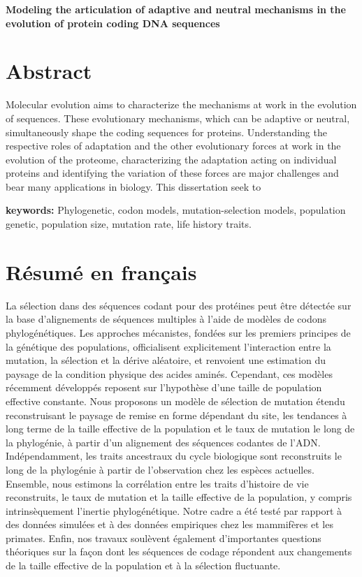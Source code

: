 \begin{center}
	\LARGE
	\textbf{Modeling the articulation of adaptive and neutral mechanisms in the evolution of protein coding DNA sequences}
\end{center}
\endgroup
\begingroup
\setlength{\parskip}{0.5em}

\section*{Abstract}
Molecular evolution aims to characterize the mechanisms at work in the evolution of sequences.
These evolutionary mechanisms, which can be adaptive or neutral, simultaneously shape the coding sequences for proteins.
Understanding the respective roles of adaptation and the other evolutionary forces at work in the evolution of the proteome, characterizing the adaptation acting on individual proteins and identifying the variation of these forces are major challenges and bear many applications in biology.
This dissertation seek to 

\textbf{keywords: }{Phylogenetic, codon models, mutation-selection models, population genetic, population size, mutation rate, life history traits.}

\newpage
\section*{Résumé en français}

La sélection dans des séquences codant pour des protéines peut être détectée sur la base d'alignements de séquences multiples à l'aide de modèles de codons phylogénétiques.
Les approches mécanistes, fondées sur les premiers principes de la génétique des populations, officialisent explicitement l'interaction entre la mutation, la sélection et la dérive aléatoire, et renvoient une estimation du paysage de la condition physique des acides aminés.
Cependant, ces modèles récemment développés reposent sur l'hypothèse d'une taille de population effective constante.
Nous proposons un modèle de sélection de mutation étendu reconstruisant le paysage de remise en forme dépendant du site, les tendances à long terme de la taille effective de la population et le taux de mutation le long de la phylogénie, à partir d'un alignement des séquences codantes de l'ADN.
Indépendamment, les traits ancestraux du cycle biologique sont reconstruits le long de la phylogénie à partir de l'observation chez les espèces actuelles.
Ensemble, nous estimons la corrélation entre les traits d'histoire de vie reconstruits, le taux de mutation et la taille effective de la population, y compris intrinsèquement l'inertie phylogénétique.
Notre cadre a été testé par rapport à des données simulées et à des données empiriques chez les mammifères et les primates.
Enfin, nos travaux soulèvent également d'importantes questions théoriques sur la façon dont les séquences de codage répondent aux changements de la taille effective de la population et à la sélection fluctuante.

